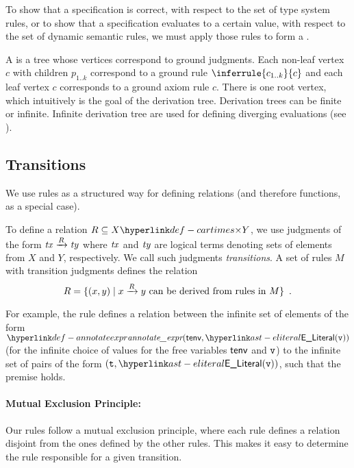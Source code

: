 To show that a specification is correct, with respect to the set of type system rules,
or to show that a specification evaluates to a certain value, with respect to
the set of dynamic semantic rules, we must apply those rules to form a \emph{\derivationtreeterm}.

\hypertarget{def-derivationtree}{}
\begin{definition}
A \emph{\derivationtreeterm} is a tree whose vertices correspond to ground judgments.
Each non-leaf vertex $c$ with children $p_{1..k}$ correspond to a ground rule
$\inferrule{c_{1..k}}{c}$ and each leaf vertex $c$ corresponds to a ground axiom rule
$c$. There is one root vertex, which intuitively is the goal of the derivation tree.
Derivation trees can be finite or infinite.
Infinite derivation tree are used for defining diverging evaluations
(see ).
\end{definition}

\subsection{Transitions\label{sec:transitions}}

We use rules as a structured way for defining relations (and therefore functions, as a special case).

To define a relation $R \subseteq X \cartimes Y$, we use judgments of the form $\mathit{tx} \xrightarrow{R} \mathit{ty}$
where $\mathit{tx}$ and $\mathit{ty}$ are logical terms denoting sets of elements from $X$ and $Y$, respectively.
%
We call such judgments \emph{transitions}.
A set of rules $M$ with transition judgments defines the relation
\[
    R = \{ (x,y) \;|\; x \xrightarrow{R} y \text{ can be derived from rules in } M\} \enspace.
\]

For example, the rule  defines a relation
between the infinite set of elements of the form
$\annotateexpr{\tenv, \ELiteral(\vv)}$ (for the
infinite choice of values for the free variables $\textsf{tenv}$ and
$\texttt{v}$) to the infinite set of pairs of the form $(\vt,
\ELiteral(\vv))$, such that the premise holds.

\paragraph{Mutual Exclusion Principle:}
Our rules follow a mutual exclusion principle, where each rule
defines a relation disjoint from the ones defined by the other
rules. This makes it easy to determine the rule responsible
for a given transition.

